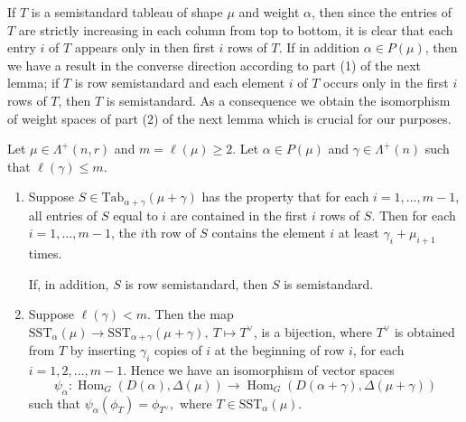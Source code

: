 \documentclass[ALCO,Unicode]{cedram}
\newcommand{\al}{\alpha}
\newcommand{\La}{\Lambda}
\DeclareMathOperator{\Hom}{Hom}
\numberwithin{equation}{section}
\begin{document}
If $T$ is a semistandard tableau of shape $\mu$ and weight $\alpha$, then since the entries of $T$ are strictly increasing in each column from top to bottom, it is clear that each entry $i$ of $T$ appears only in then first $i$ rows of $T$. If in addition $\alpha \in P(\mu)$, then we have a result in the converse direction according to part (1) of the next lemma; if $T$ is row semistandard and each element $i$ of $T$ occurs only in the first $i$ rows of $T$, then $T$ is semistandard.  As a consequence we obtain the isomorphism of weight spaces of part (2) of the next lemma which is crucial for our purposes.
	\begin{lemma}\label{lem12}Let $\mu\in \La^+(n,r)$ and $m=\ell(\mu) \ge 2$. Let $\al \in P(\mu)$ and $\gamma \in \La^{+}(n)$ such that $\ell(\gamma) \le m$.
	\begin{enumerate}	
	\item  Suppose $S \in \mathrm{Tab}_{\al+\gamma}(\mu+\gamma)$ has the property that for each $i=1,\dots,m-1$, all entries of $S$ equal to $i$ are contained in the first $i$ rows of $S$. Then for each $i=1,\dots,m-1$, the $i$th row of $S$ contains the element $i$ at least $\gamma_i+\mu_{i+1}$ times.
		
			If, in addition, $S$ is row semistandard, then $S$ is semistandard.
			
			\item Suppose $\ell(\gamma) < m$. Then the map $\mathrm{SST}_{\al}(\mu) \to \mathrm{SST}_{\al+\gamma}(\mu+\gamma), \ T \mapsto T^{\vee}$, is a bijection, where $T^{\vee}$ is obtained from $T$ by inserting $\gamma_i$ copies of $i$ at the beginning of row $i$, for each $i=1,2,\dots,m-1$. Hence we have an isomorphism of vector spaces \[\psi_{\al}: \Hom_G(D(\al),\Delta(\mu)) \to \Hom_{G}(D(\al+\gamma),\Delta(\mu+\gamma))\] such that $\psi_{\al}(\phi_T)=\phi_{T^{\vee}},$ where $T \in \mathrm{SST}_{\al}(\mu).$ \end{enumerate}	\end{lemma}
\end{document}
